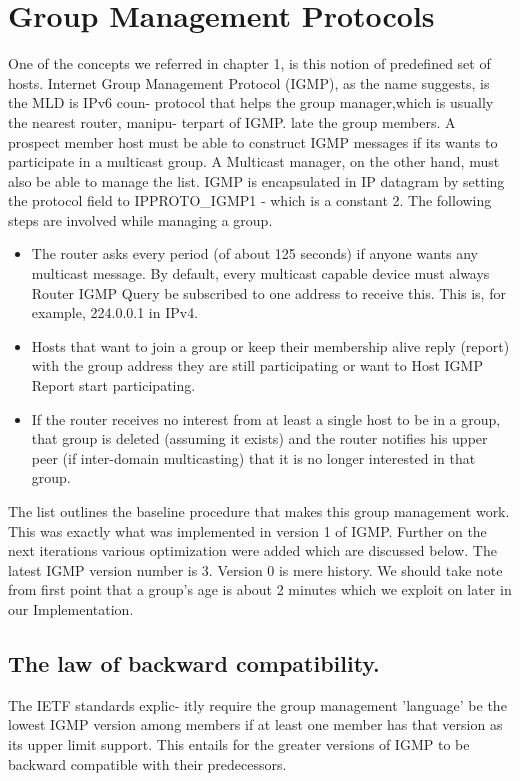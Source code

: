 \documentclass[11pt,left=2cm,bottom=2cm,oneside]{book}
\begin{document}
\section{Group Management Protocols}
One of the concepts we referred in chapter 1, is this notion of predefined set
of
hosts. Internet Group Management Protocol (IGMP), as the name suggests, is the
MLD is IPv6 coun-
protocol that helps the group manager,which is usually the nearest router,
manipu- terpart of IGMP.
late the group members. A prospect member host must be able to construct IGMP
messages if its wants to participate in a multicast group. A Multicast
manager, on
the other hand, must also be able to manage the list. IGMP is encapsulated in
IP
datagram by setting the protocol field to IPPROTO\_IGMP1 - which is a constant
2. The following steps are involved while managing a group.
\begin{itemize}
\item The router asks every period (of about 125 seconds) if anyone wants any
multicast message. By default, every multicast capable device must always
Router IGMP Query
be subscribed to one address to receive this. This is, for example, 224.0.0.1
in IPv4.
\item Hosts that want to join a group or keep their membership alive reply
(report) with the group address they are still participating or want to
Host IGMP Report
start participating.
\item If the router receives no interest from at least a single host to be in a
group, that group is deleted (assuming it exists) and the router notifies
his upper peer (if inter-domain multicasting) that it is no longer interested
in that group.
\end{itemize}
The list outlines the baseline procedure that makes this group management
work.
This was exactly what was implemented in version 1 of IGMP. Further on the
next
iterations various optimization were added which are discussed below. The
latest
IGMP version number is 3. Version 0 is mere history.
We should take note from first point that a group's age is about 2 minutes
which we exploit on later in our Implementation.
\subsection{The law of backward compatibility.} The IETF standards explic-
itly require the group management 'language' be the lowest IGMP version among
members if at least one member has that version as its upper limit support.
This
entails for the greater versions of IGMP to be backward compatible with their
predecessors.
\end{document}

